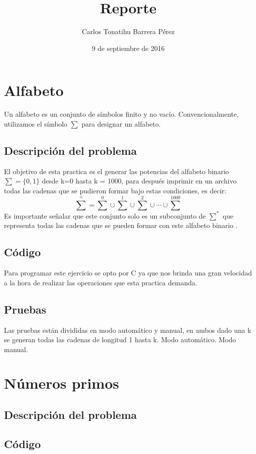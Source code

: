 \documentclass[12pt, titlepage]{article}
\title{Reporte}
\author{Carlos Tonatihu Barrera Pérez}
\date{9 de septiembre de 2016}
\begin{document}
	\maketitle
	\tableofcontents
	\newpage
	
	\section{Alfabeto}
	Un alfabeto es un conjunto de símbolos finito y no vacío. Convencionalmente, utilizamos el símbolo $ \sum $ para designar un alfabeto. \cite{LIBRO}
	\subsection{Descripción del problema}
	El objetivo de esta practica es el generar las potencias del alfabeto binario $ \sum = \lbrace 0, 1 \rbrace $ desde k=0 hasta k = 1000, para después imprimir en un archivo todas las cadenas que se pudieron formar bajo estas condiciones, es decir: 
	\[{\sum}^{+} = {\sum}^{0}\cup{\sum}^{1}\cup{\sum}^{2}\cup\cdots\cup{\sum}^{1000}\]
	Es importante señalar que este conjunto solo es un subconjunto de $ {\sum}^{*} $ que representa todas las cadenas que se pueden formar con este alfabeto binario .
	\subsection{Código}
	Para programar este ejercicio se opto por C ya que nos brinda una gran velocidad a la hora de realizar las operaciones que esta practica demanda.
	\subsection{Pruebas}
	Las pruebas están divididas en modo automático y manual, en ambos dado una k se generan todas las cadenas de longitud 1 hasta k.
	{\large Modo automático.}
	{\large Modo manual.}
	
	\section{Números primos}
	\lipsum[1]
	\subsection{Descripción del problema}
	\lipsum[1]
	\subsection{Código}
	\lipsum[1]
\end{document}
